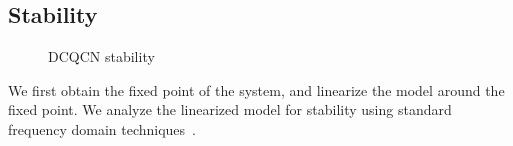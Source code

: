 \subsection{Stability}
\label{sec:dcqcn_stability}

\begin{figure}[t]
\center
{}
\vspace{-2em}
\caption{DCQCN stability}
\vspace{-1em}
\label{fig:dcqcn_stability}
\end{figure}
We first obtain the fixed point of the system, and linearize the model around
the fixed point. We analyze the linearized model for stability using standard
frequency domain techniques~\cite{controltheory}.  

